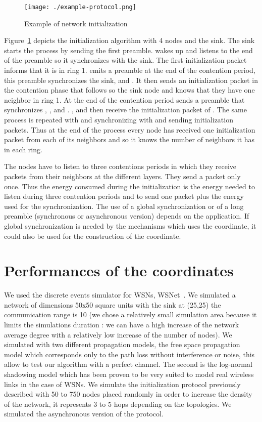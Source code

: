 \documentclass[a4paper]{article}
\begin{document}
\begin{figure}[!h]
  \centering
  \texttt{[image: ./example-protocol.png]}
  \caption{Example of network initialization}
  \label{example}
\end{figure}

Figure~\ref{example} depicts the initialization algorithm with 4 nodes and the sink. The sink starts the process by sending the first preamble.  wakes up and listens to the end of the preamble so it synchronizes with the sink. The first initialization packet informs  that it is in ring 1.  emits a preamble at the end of the contention period, this preamble synchronizes the sink,  and . It then sends an initialization packet in the contention phase that follows so the sink node and  knows that they have one neighbor in ring 1. At the end of the contention period  sends a preamble that synchronizes , ,  and . ,  and  then receive the initialization packet of . The same process is repeated with  and  synchronizing with  and sending initialization packets. Thus at the end of the process every node has received one initialization packet from each of its neighbors and so it knows the number of neighbors it has in each ring.

The nodes have to listen to three contentions periods in which they receive packets from their neighbors at the different layers. They send a packet only once. Thus the energy consumed during the initialization is the energy needed to listen during three contention periods and to send one packet plus the energy used for the synchronization. The use of a global synchronization or of a long preamble (synchronous or asynchronous version) depends on the application. If global synchronization is needed by the mechanisms which uses the coordinate, it could also be used for the construction of the coordinate.


\section{Performances of the coordinates}








We used the discrete events simulator for WSNs, WSNet~\cite{wsnet}. We simulated a network of dimensions 50x50 square units with the sink at (25,25) the communication range is 10 (we chose a relatively small simulation area because it limits the simulations duration : we can have a high increase of the network average degree with a relatively low increase of the number of nodes). We simulated with two different propagation models, the free space propagation model which corresponds only to the path loss without interference or noise, this allow to test our algorithm with a perfect channel. The second is the log-normal shadowing model which has been proven \cite{Zuniga04} to be very suited to model real wireless links in the case of WSNs. We simulate the initialization protocol previously described with 50 to 750 nodes placed randomly in order to increase the density of the network, it represents 3 to 5 hops depending on the topologies. We simulated the asynchronous version of the protocol.
\end{document}
